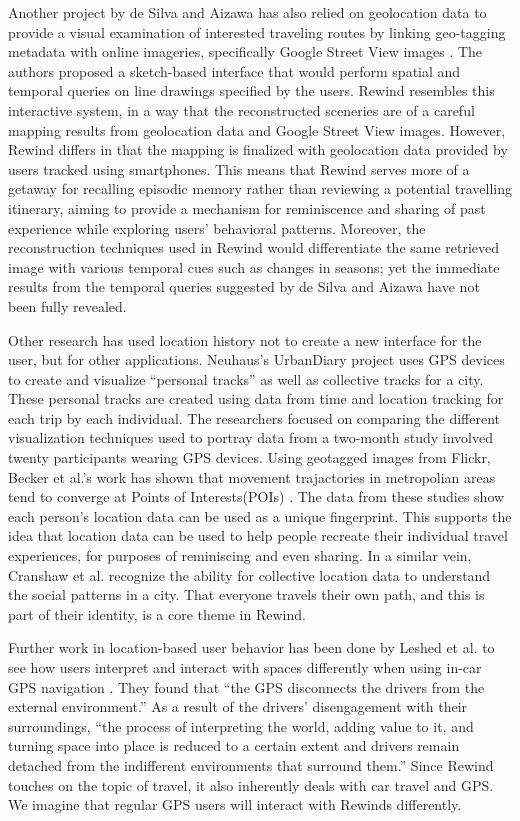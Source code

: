 \documentclass{sigchi}
\begin{document}
Another project by de Silva and Aizawa has also relied on geolocation data to provide a visual examination of interested traveling routes by linking geo-tagging metadata with online imageries, specifically Google Street View images \cite{deSilva:2009:RMT:1631272.1631414}. The authors proposed a sketch-based interface that would perform spatial and temporal queries on line drawings specified by the users. Rewind resembles this interactive system, in a way that the reconstructed sceneries are of a careful mapping results from geolocation data and Google Street View images. However, Rewind differs in that the mapping is finalized with geolocation data provided by users tracked using smartphones. This means that Rewind serves more of a getaway for recalling episodic memory rather than reviewing a potential travelling itinerary, aiming to provide a mechanism for reminiscence and sharing of past experience while exploring users' behavioral patterns. Moreover, the reconstruction techniques used in Rewind would differentiate the same retrieved image with various temporal cues such as changes in seasons; yet the immediate results from the temporal queries suggested by de Silva and Aizawa have not been fully revealed. 

Other research has used location history not to create a new interface for the user, but for other applications. Neuhaus's UrbanDiary project \cite{neuhaus2010urbandiary} uses GPS devices to create and visualize ``personal tracks'' as well as collective tracks for a city. These personal tracks are created using data from time and location tracking for each trip by each individual. The researchers focused on comparing the different visualization techniques used to portray data from a two-month study involved twenty participants wearing GPS devices. Using geotagged images from Flickr, Becker et al.'s work has shown that movement trajactories in metropolian areas tend to converge at Points of Interests(POIs) \cite{Becker2015}. The data from these studies show each person's location data can be used as a unique fingerprint. This supports the idea that location data can be used to help people recreate their individual travel experiences, for purposes of reminiscing and even sharing. In a similar vein, Cranshaw et al. \cite{cranshaw2012livehoods} recognize the ability for collective location data to understand the social patterns in a city. That everyone travels their own path, and this is part of their identity, is a core theme in Rewind.

Further work in location-based user behavior has been done by Leshed et al. to see how users interpret and interact with spaces differently when using in-car GPS navigation \cite{leshed2008car}. They found that ``the GPS disconnects the drivers from the external environment.'' As a result of the drivers' disengagement with their surroundings, ``the process of interpreting the world, adding value to it, and turning space into place is reduced to a certain extent and drivers remain detached from the indifferent environments that surround them.'' Since Rewind touches on the topic of travel, it also inherently deals with car travel and GPS. We imagine that regular GPS users will interact with Rewinds differently.
\end{document}
